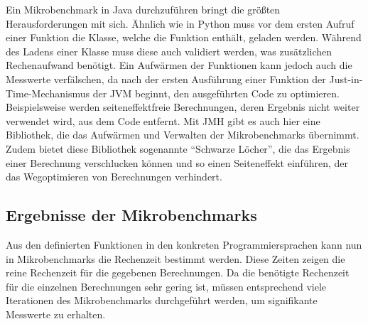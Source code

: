 \documentclass[11pt, parskip=half]{scrartcl}       %
\begin{document}
Ein Mikrobenchmark in Java durchzuführen bringt die größten Herausforderungen mit sich.
Ähnlich wie in Python muss vor dem ersten Aufruf einer Funktion die Klasse, welche die Funktion enthält, geladen werden.
Während des Ladens einer Klasse muss diese auch validiert werden, was zusätzlichen Rechenaufwand benötigt.
Ein Aufwärmen der Funktionen kann jedoch auch die Messwerte verfälschen, da nach der ersten Ausführung einer Funktion der Just-in-Time-Mechanismus der JVM beginnt, den ausgeführten Code zu optimieren.
Beispielsweise werden seiteneffektfreie Berechnungen, deren Ergebnis nicht weiter verwendet wird, aus dem Code entfernt.
Mit JMH gibt es auch hier eine Bibliothek, die das Aufwärmen und Verwalten der Mikrobenchmarks übernimmt.
Zudem bietet diese Bibliothek sogenannte ``Schwarze Löcher'', die das Ergebnis einer Berechnung verschlucken können und so einen Seiteneffekt einführen, der das Wegoptimieren von Berechnungen verhindert.


\subsection{Ergebnisse der Mikrobenchmarks}

Aus den definierten Funktionen in den konkreten Programmiersprachen kann nun in Mikrobenchmarks die Rechenzeit bestimmt werden.
Diese Zeiten zeigen die reine Rechenzeit für die gegebenen Berechnungen.
Da die benötigte Rechenzeit für die einzelnen Berechnungen sehr gering ist, müssen entsprechend viele Iterationen des Mikrobenchmarks durchgeführt werden, um signifikante Messwerte zu erhalten.
\end{document}
